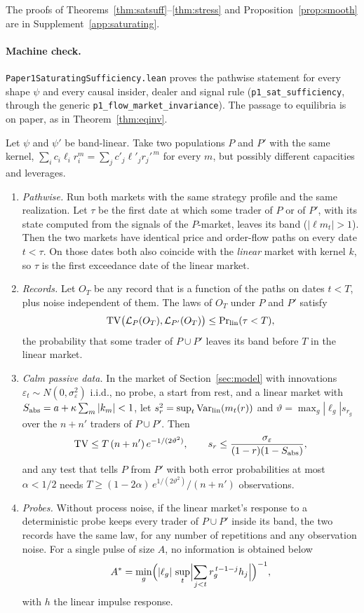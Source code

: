 The proofs of Theorems~\ref{thm:satsuff}--\ref{thm:stress} and Proposition~\ref{prop:smooth} are in Supplement~\ref{app:saturating}.

\paragraph{Machine check.} \nolinkurl{Paper1SaturatingSufficiency.lean} proves the pathwise statement for every shape $\psi$ and every causal insider, dealer and signal rule (\texttt{p1\_sat\_sufficiency}, through the generic \texttt{p1\_flow\_market\_invariance}). The passage to equilibria is on paper, as in Theorem~\ref{thm:eqinv}.

\begin{theorem}\label{thm:stress}
Let $\psi$ and $\psi'$ be band-linear. Take two populations $P$ and $P'$ with the same kernel, $\sum_ic_i\ell_ir_i^m=\sum_jc'_j\ell'_jr_j'^{\,m}$ for every $m$, but possibly different capacities and leverages.
\begin{enumerate}[label=(\roman*),itemsep=1pt]
\item \emph{Pathwise.} Run both markets with the same strategy profile and the same realization. Let $\tau$ be the first date at which some trader of $P$ or of $P'$, with its state computed from the signals of the $P$-market, leaves its band ($|\ell m_t|>1$). Then the two markets have identical price and order-flow paths on every date $t<\tau$. On those dates both also coincide with the \emph{linear} market with kernel $k$, so $\tau$ is the first exceedance date of the linear market.
\item \emph{Records.} Let $O_T$ be any record that is a function of the paths on dates $t<T$, plus noise independent of them. The laws of $O_T$ under $P$ and $P'$ satisfy
\[
 \mathrm{TV}\bigl(\mathcal L_P(O_T),\mathcal L_{P'}(O_T)\bigr)\le\Pr\nolimits_{\rm lin}(\tau<T),
\]
the probability that some trader of $P\cup P'$ leaves its band before $T$ in the linear market.
\item \emph{Calm passive data.} In the market of Section~\ref{sec:model} with innovations $\varepsilon_t\sim N(0,\sigma_\varepsilon^2)$ i.i.d., no probe, a start from rest, and a linear market with $S_{\rm abs}=a+\kappa\sum_m|k_m|<1$, let $s_r^2=\sup_t\mathrm{Var}_{\rm lin}(m_t(r))$ and $\vartheta=\max_g|\ell_g|s_{r_g}$ over the $n+n'$ traders of $P\cup P'$. Then
\[
 \mathrm{TV}\le T\,(n+n')\,e^{-1/(2\vartheta^2)},\qquad s_r\le\frac{\sigma_\varepsilon}{(1-r)(1-S_{\rm abs})},
\]
and any test that tells $P$ from $P'$ with both error probabilities at most $\alpha<1/2$ needs $T\ge(1-2\alpha)\,e^{1/(2\vartheta^2)}/(n+n')$ observations.
\item \emph{Probes.} Without process noise, if the linear market's response to a deterministic probe keeps every trader of $P\cup P'$ inside its band, the two records have the same law, for any number of repetitions and any observation noise. For a single pulse of size $A$, no information is obtained below
\[
 A^*=\min_g\Bigl(|\ell_g|\,\sup_t\Bigl|\sum_{j<t}r_g^{\,t-1-j}h_j\Bigr|\Bigr)^{-1},
\]
with $h$ the linear impulse response.
\end{enumerate}
\end{theorem}


